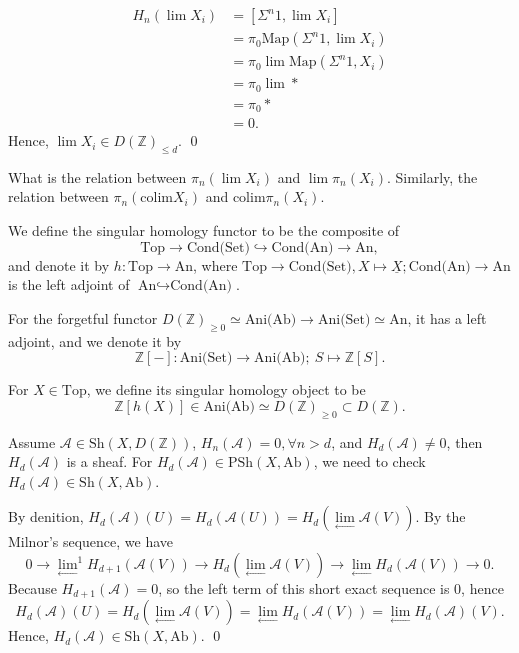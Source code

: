 \documentclass[UTF8,12,a4paper]{ctexart}
\theoremstyle{definition}
\begin{document}
\begin{align*}
H_n(\lim X_i)
&=\left[\Sigma^{n} 1,\lim X_i\right] \\
&=\pi_0 \text{Map}(\Sigma^{n} 1,\lim X_i)\\
&=\pi_0 \lim \text{Map}(\Sigma^{n} 1,X_i)\\
&=\pi_0 \lim *\\
&=\pi_0  *\\
&=0.
\end{align*}
Hence, $\lim X_i\in D(\mathbb{Z})_{\leq d}. $
\qed

\prob
What is the relation between $\pi_n(\lim X_i)$ and $\lim \pi_n(X_i).$
Similarly, the relation between $\pi_n(\text{colim} X_i)$ and $\text{colim} \pi_n(X_i).$

\dfn
We define the singular homology functor to be the composite of 
$$
\text{Top}\rightarrow \text{Cond(Set)}\hookrightarrow \text{Cond(An)}\rightarrow \text{An},
$$
and denote it by $h: \text{Top}\rightarrow \text{An}$, where 
$\text{Top}\rightarrow \text{Cond(Set)}, X\mapsto \underline{X}; \text{Cond(An)}\rightarrow \text{An} $ is the left adjoint of $\text{An}\hookrightarrow \text{Cond(An)}$.

\dfn
For the forgetful functor $D(\mathbb{Z})_{\geq 0}\simeq \text{Ani(Ab)}\rightarrow \text{Ani(Set)}\simeq \text{An}$, it has a left adjoint, and we denote it by
$$
\mathbb{Z}\left[-\right]:\text{Ani(Set)}\rightarrow \text{Ani(Ab)};\ S\mapsto \mathbb{Z}\left[S\right].
$$

\dfn 
For $X\in \text{Top}$, we define its singular homology object to be
$$
\mathbb{Z}\left[h(X)\right]\in \text{Ani(Ab)}\simeq D(\mathbb{Z})_{\geq 0}\subset D(\mathbb{Z}).
$$



\lem Assume $\mathcal{A}\in \text{Sh}(X,D(\mathbb{Z}))$, $H_n(\mathcal{A})=0,\forall n>d$, and $H_d(\mathcal{A})\neq 0$, then $H_d(\mathcal{A})$ is a sheaf.
\pf
For $H_d(\mathcal{A})\in \text{PSh}(X,\text{Ab})$, we need to check $H_d(\mathcal{A})\in \text{Sh}(X,\text{Ab})$.

By denition, $H_d(\mathcal{A})(U)=H_d(\mathcal{A}(U))=H_d({\underset{\longleftarrow}{\lim}}\mathcal{A}(V)).$
By the Milnor's sequence, we have
$$
0\longrightarrow \underset{\longleftarrow}{\lim}^{1}H_{d+1}(\mathcal{A}(V))\longrightarrow H_d({\underset{\longleftarrow}{\lim}}\mathcal{A}(V))\longrightarrow \underset{\longleftarrow}{\lim}H_{d}(\mathcal{A}(V))\longrightarrow 0.
$$
Because $H_{d+1}(\mathcal{A})=0$, so the left term of this short exact sequence is 0, hence
$$
H_d(\mathcal{A})(U)=H_d({\underset{\longleftarrow}{\lim}}\mathcal{A}(V))=\underset{\longleftarrow}{\lim}H_{d}(\mathcal{A}(V))=\underset{\longleftarrow}{\lim}H_{d}(\mathcal{A})(V).
$$
Hence, $H_d(\mathcal{A})\in \text{Sh}(X,\text{Ab}).$
\qed
\end{document}
